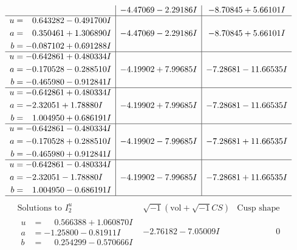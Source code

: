 \documentclass[1p]{elsarticle_modified}
\theoremstyle{definition}
\newcommand{\I}{\sqrt{-1}}
\begin{document}
$$\begin{array}{c|c|c}
 & -4.47069 - 2.29186 I & -8.70845 + 5.66101 I \\ \hline\begin{aligned}
u &= \phantom{-}0.643282 - 0.491700 I \\
a &= \phantom{-}0.350461 + 1.306890 I \\
b &= -0.087102 + 0.691288 I\end{aligned}
 & -4.47069 - 2.29186 I & -8.70845 + 5.66101 I \\ \hline\begin{aligned}
u &= -0.642861 + 0.480334 I \\
a &= -0.170528 - 0.288510 I \\
b &= -0.465980 - 0.912841 I\end{aligned}
 & -4.19902 + 7.99685 I & -7.28681 - 11.66535 I \\ \hline\begin{aligned}
u &= -0.642861 + 0.480334 I \\
a &= -2.32051 + 1.78880 I \\
b &= \phantom{-}1.004950 + 0.686191 I\end{aligned}
 & -4.19902 + 7.99685 I & -7.28681 - 11.66535 I \\ \hline\begin{aligned}
u &= -0.642861 - 0.480334 I \\
a &= -0.170528 + 0.288510 I \\
b &= -0.465980 + 0.912841 I\end{aligned}
 & -4.19902 - 7.99685 I & -7.28681 + 11.66535 I \\ \hline\begin{aligned}
u &= -0.642861 - 0.480334 I \\
a &= -2.32051 - 1.78880 I \\
b &= \phantom{-}1.004950 - 0.686191 I\end{aligned}
 & -4.19902 - 7.99685 I & -7.28681 + 11.66535 I\\
 \hline 
 \end{array}$$\newpage$$\begin{array}{c|c|c}  
\text{Solutions to }I^u_{2}& \I (\text{vol} + \sqrt{-1}CS) & \text{Cusp shape}\\
 \hline 
\begin{aligned}
u &= \phantom{-}0.566388 + 1.060870 I \\
a &= -1.25800 - 0.81911 I \\
b &= \phantom{-}0.254299 - 0.570666 I\end{aligned}
 & -2.76182 - 7.05009 I & \phantom{-0.000000 } 0 \\ \hline\begin{aligned}

\end{aligned}
\end{array}$$
\end{document}

